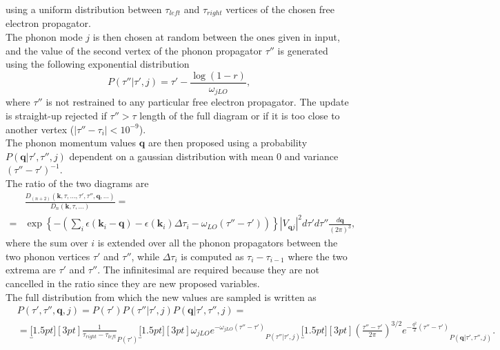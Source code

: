 using a uniform distribution between $\tau_{left}$ and $\tau_{right}$ vertices of the chosen free electron propagator.\\
The phonon mode $j$ is then chosen at random between the ones given in input, and the value of the second vertex of the phonon propagator $\tau''$ is generated using the
following exponential distribution
\begin{equation}
    P(\tau''|\tau',j)=\tau'-\frac{\log(1-r)}{\omega_{jLO}},
\end{equation}
where $\tau''$ is not restrained to any particular free electron propagator. The update is straight-up rejected if $\tau''>\tau$ length of the 
full diagram or if it is too close to another vertex ($|\tau''-\tau_i|<10^{-9}$).\\
The phonon momentum values $\mathbf{q}$ are then proposed using a probability $P(\mathbf{q}|\tau',\tau'',j)$ dependent on a gaussian distribution with 
mean $0$ and variance $(\tau''-\tau')^{-1}$.\\
The ratio of the two diagrams are
\begin{equation}
\begin{split}
    &\frac{D_{(n+2)}(\mathbf{k},\tau,...,\tau',\tau'',\mathbf{q},...)}{D_{n}(\mathbf{k},\tau,...)}=\\
    =&\exp{\left\{-\left(\sum_i\epsilon(\mathbf{k}_i-\mathbf{q})-\epsilon(\mathbf{k}_i)\Delta\tau_i-\omega_{LO}(\tau''-\tau')\right)\right\}}|V_{\mathbf{q}j}|^2d\tau'd\tau''\frac{d\mathbf{q}}{(2\pi)^3},
\end{split}
\end{equation}
where the sum over $i$ is extended over all the phonon propagators between the two phonon vertices $\tau'$ and $\tau''$, while $\Delta\tau_i$ is computed as $\tau_i-\tau_{i-1}$ where the two 
extrema are $\tau'$ and $\tau''$. The infinitesimal are required because they are not cancelled in the ratio since they are new proposed variables.\\
The full distribution from which the new values are sampled is written as
\begin{equation}
\begin{split}
    &P(\tau',\tau'',\mathbf{q},j)=P(\tau')P(\tau''|\tau',j)P(\mathbf{q}|\tau',\tau'',j)=\\
    &=\underbracket[1.5pt][3pt]{\frac{1}{\tau_{right}-\tau_{left}}}_{P(\tau')}\underbracket[1.5pt][3pt]{\omega_{jLO}e^{-\omega_{jLO}(\tau''-\tau')}}_{P(\tau''|\tau',j)}
    \underbracket[1.5pt][3pt]{\left(\frac{\tau''-\tau'}{2\pi}\right)^{3/2}e^{-\frac{q^2}{2}(\tau''-\tau')}}_{P(\mathbf{q}|\tau',\tau'',j)}.
\end{split}
\end{equation}
